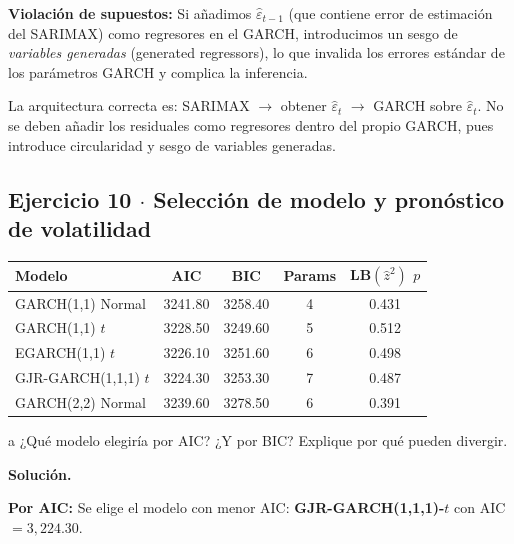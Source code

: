 \documentclass[11pt,a4paper]{article}
\newcommand{\eps}{\varepsilon}
\begin{document}
\textbf{Violación de supuestos:} Si añadimos $\hat{\eps}_{t-1}$ (que contiene error de estimación del SARIMAX) como regresores en el GARCH, introducimos un sesgo de \emph{variables generadas} (generated regressors), lo que invalida los errores estándar de los parámetros GARCH y complica la inferencia.

\begin{cajaHallazgo}
La arquitectura correcta es: SARIMAX $\to$ obtener $\hat{\eps}_t$ $\to$ GARCH sobre $\hat{\eps}_t$. No se deben añadir los residuales como regresores dentro del propio GARCH, pues introduce circularidad y sesgo de variables generadas.
\end{cajaHallazgo}

\subsection*{Ejercicio 10 \texorpdfstring{$\cdot$}{·} Selección de modelo y pronóstico de volatilidad}

\begin{center}
\begin{tabular}{@{}lcccc@{}}
\toprule
Modelo & AIC & BIC & Params & LB$(\hat{z}^2)$ $p$ \\
\midrule
GARCH(1,1) Normal      & 3241.80 & 3258.40 & 4 & 0.431 \\
GARCH(1,1) $t$         & 3228.50 & 3249.60 & 5 & 0.512 \\
EGARCH(1,1) $t$        & 3226.10 & 3251.60 & 6 & 0.498 \\
GJR-GARCH(1,1,1) $t$   & 3224.30 & 3253.30 & 7 & 0.487 \\
GARCH(2,2) Normal      & 3239.60 & 3278.50 & 6 & 0.391 \\
\bottomrule
\end{tabular}
\end{center}

\begin{cajaInciso}{a}
¿Qué modelo elegiría por AIC? ¿Y por BIC? Explique por qué pueden divergir.
\end{cajaInciso}

\textbf{Solución.}

\textbf{Por AIC:} Se elige el modelo con menor AIC: \textbf{GJR-GARCH(1,1,1)-$t$} con AIC $=3{,}224.30$.
\end{document}
